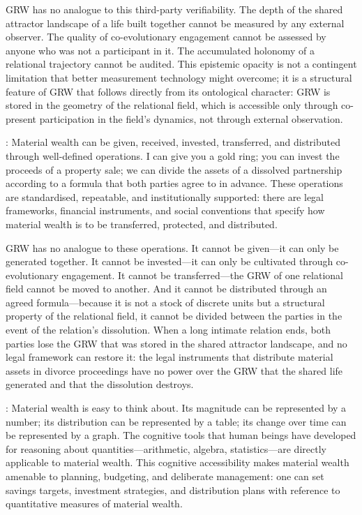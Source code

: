 GRW has no analogue to this third-party verifiability. The depth of the shared attractor landscape of a life built together cannot be measured by any external observer. The quality of co-evolutionary engagement cannot be assessed by anyone who was not a participant in it. The accumulated holonomy of a relational trajectory cannot be audited. This epistemic opacity is not a contingent limitation that better measurement technology might overcome; it is a structural feature of GRW that follows directly from its ontological character: GRW is stored in the geometry of the relational field, which is accessible only through co-present participation in the field's dynamics, not through external observation.

: Material wealth can be given, received, invested, transferred, and distributed through well-defined operations. I can give you a gold ring; you can invest the proceeds of a property sale; we can divide the assets of a dissolved partnership according to a formula that both parties agree to in advance. These operations are standardised, repeatable, and institutionally supported: there are legal frameworks, financial instruments, and social conventions that specify how material wealth is to be transferred, protected, and distributed.

GRW has no analogue to these operations. It cannot be given---it can only be generated together. It cannot be invested---it can only be cultivated through co-evolutionary engagement. It cannot be transferred---the GRW of one relational field cannot be moved to another. And it cannot be distributed through an agreed formula---because it is not a stock of discrete units but a structural property of the relational field, it cannot be divided between the parties in the event of the relation's dissolution. When a long intimate relation ends, both parties lose the GRW that was stored in the shared attractor landscape, and no legal framework can restore it: the legal instruments that distribute material assets in divorce proceedings have no power over the GRW that the shared life generated and that the dissolution destroys.

: Material wealth is easy to think about. Its magnitude can be represented by a number; its distribution can be represented by a table; its change over time can be represented by a graph. The cognitive tools that human beings have developed for reasoning about quantities---arithmetic, algebra, statistics---are directly applicable to material wealth. This cognitive accessibility makes material wealth amenable to planning, budgeting, and deliberate management: one can set savings targets, investment strategies, and distribution plans with reference to quantitative measures of material wealth.

